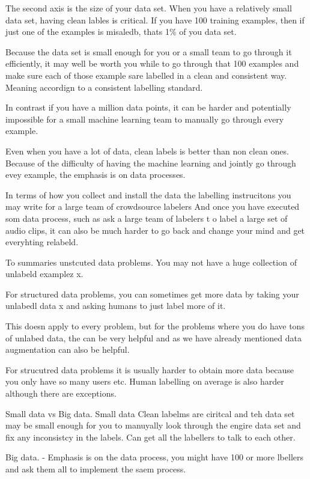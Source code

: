 The second axis is the size of your data set. When you have a relatively small data set, having clean lables is critical. If you have 100 training examples, then if just one of the examples is misaledb, thats 1\% of you data set.

Because the data set is small enough for you or a small team to go through it efficiently, it may well be worth you while to go through that 100 examples and make sure each of those example sare labelled in a clean and consistent way.
Meaning accordign to a consistent labelling standard.

In contrast if you have a million data points, it can be harder and potentially impossible for a small machine learning team to manually go through every example.

Even when you have a lot of data, clean labels is better than non clean ones.
Because of the difficulty of having the machine learning and jointly go through evey example, the emphasis is on data processes.

In terms of how you collect and install the data the labelling instrucitons you may write for a large team of crowdsource labelers
And once you have executed som data process, such as ask a large team of labelers t o label a large set of audio clips, it can also be much harder to go back and change your mind and get everyhting relabeld.


To summaries unstcuted data problems.
You may not have a huge collection of unlabeld examplez x.

For structured data problems, you can sometimes get more data by taking your unlabedl data x and asking humans to just label more of it.

This doesn apply to every problem, but for the problems where you do have tons of unlabed data, the can be very helpful and as we have already mentioned data augmentation can also be helpful.

For strucutred data problems it is usually harder to obtain more data because you only have so many users etc.
Human labelling on average is also harder although there are exceptions.

Small data vs Big data.
Small data
Clean labelms are ciritcal and teh data set may be small enough for you to manuyally look through the engire data set and fix any inconsistcy in the labels.
 Can get all the labellers to talk to each other.

Big data.
- Emphasis is on the data process, you might have 100 or more lbellers and ask them all to implement the saem process.


